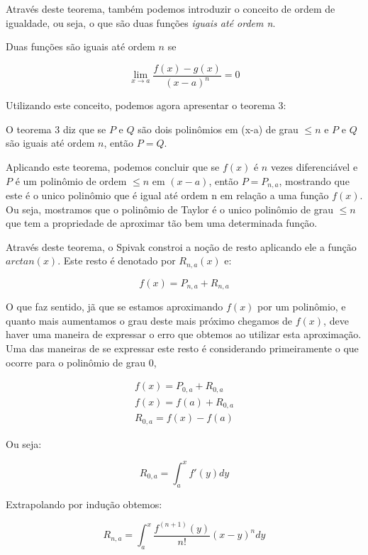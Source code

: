 \documentclass[a4paper, 12pt]{article}
\begin{document}
Através deste teorema, também podemos introduzir o conceito de ordem de igualdade,
ou seja, o que são duas funções \textit{iguais até ordem n}.

Duas funções são iguais até ordem $n$ se

\begin{equation}
	\lim_{x \to a }\frac{f(x) - g(x)}{(x-a)^n} = 0
\end{equation}

Utilizando este conceito, podemos agora apresentar o teorema 3:

O teorema 3 diz que se $P$ e $Q$ são dois polinômios em (x-a) de grau $\leq n$ e $P$
e $Q$ são iguais até ordem $n$, então $P=Q$.

Aplicando este teorema, podemos concluir que se $f(x)$ é $n$ vezes
diferenciável e $P$ é um polinômio de ordem $\leq n$ em $(x-a)$, então $P = P_{n,a}$, mostrando
que este é o unico polinômio que é igual até ordem n em relação a uma função $f(x)$. Ou seja,
mostramos que o polinômio de Taylor é o unico
polinômio de grau $\leq n $ que tem a propriedade de aproximar tão bem uma determinada função.

Através deste teorema, o Spivak constroi a noção de resto aplicando ele a função
$arctan(x)$. Este resto é denotado por $R_{n,a}(x)$ e:

\begin{equation}
	f(x) = P_{n,a} + R_{n,a}
\end{equation}

O que faz sentido, jã que se estamos aproximando $f(x)$ por um polinômio, e quanto mais aumentamos
o grau deste mais próximo chegamos de $f(x)$, deve haver uma maneira de expressar o erro
que obtemos ao utilizar esta aproximação. Uma das maneiras de se expressar este resto é considerando
primeiramente o que ocorre para o polinômio de grau $0$,

\begin{align}
	f(x) = P_{0,a} + R_{0,a} \\
	f(x) = f(a) + R_{0,a}    \\
	R_{0,a} = f(x) - f(a)
\end{align}

Ou seja:

\begin{equation}
	R_{0,a} = \int_{a}^{x} f'(y)dy
\end{equation}

Extrapolando por indução obtemos:

\begin{equation}
	R_{n,a} = \int_{a}^{x} \frac{f^{(n+1)}(y)}{n!}(x-y)^n dy
\end{equation}
\end{document}
